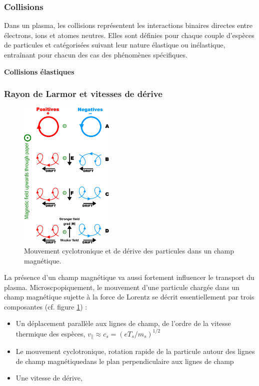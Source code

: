 			\subsubsection{Collisions}
			Dans un plasma, les collisions représentent les interactions binaires
			directes entre électrons, ions et atomes neutres. Elles sont
			définies pour chaque couple d'espèces de particules et catégorisées suivant
			leur nature élastique ou inélastique, entraînant pour chacun des cas des
			phénomènes spécifiques.
			
			\textbf{Collisions élastiques}
			
			\subsubsection{Rayon de Larmor et vitesses de dérive}
			\begin{figure}
    			\vspace{-5pt}
    			\hspace{20pt}\includegraphics[width=0.40\textwidth]{figures/particleDrifts.png}
    			\hspace{20pt}\caption{Mouvement cyclotronique et de dérive des particules
    			dans un champ magnétique.}\label{particleDrifts}
  				 \vspace{-20pt}
			\end{figure}
			La présence d'un champ magnétique va aussi fortement influencer le transport
			du plasma. Microscpopiquement, le mouvement d'une particule chargée dans un
			champ magnétique sujette à la force de Lorentz se décrit essentiellement par trois
			composantes (cf. figure \ref{particleDrifts}) :
			
			
			\begin{itemize}
			\item Un déplacement parallèle aux lignes de champ, de l'ordre de la vitesse
			thermique des espèces, $v_\parallel\approx c_s=(eT_s/m_s)^{1/2}$
			\item Le mouvement cyclotronique, rotation rapide de la particule
			autour des lignes de champ magnétiquedans le plan perpendiculaire aux lignes
			de champ
			\item Une vitesse de dérive, 
			\end{itemize}
			\lipsum
			
